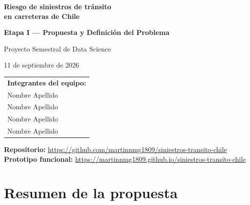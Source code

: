 \documentclass[11pt,a4paper]{article}
\begin{document}
\begin{titlepage}
\centering
\vspace*{3cm}

{\Huge\bfseries\color{azul} Riesgo de siniestros de tránsito\\[0.3em]
en carreteras de Chile\par}

\vspace{1.2cm}
{\Large\bfseries Etapa I --- Propuesta y Definición del Problema\par}

\vspace{2.5cm}
{\large Proyecto Semestral de Data Science\par}

\vspace{0.6cm}
{\large 11 de septiembre de 2026\par}

\vspace{3cm}
\begin{tabular}{l}
\textbf{Integrantes del equipo:}\\[0.4em]
Nombre Apellido\\
Nombre Apellido\\
Nombre Apellido\\
Nombre Apellido\\
\end{tabular}

\vfill
{\small
\textbf{Repositorio:} \url{https://github.com/martinnmg1809/siniestros-transito-chile}\\[0.3em]
\textbf{Prototipo funcional:} \url{https://martinnmg1809.github.io/siniestros-transito-chile}
\par}

\end{titlepage}

\tableofcontents
\newpage

\section{Resumen de la propuesta}
\end{document}
